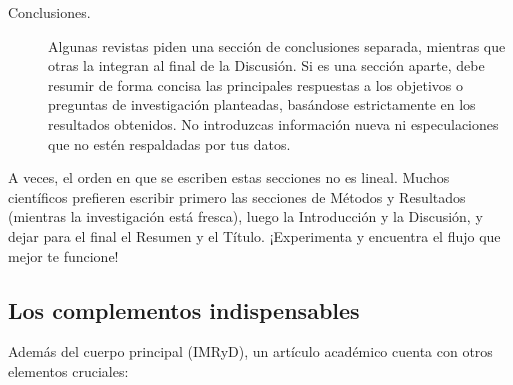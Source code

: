 \begin{description}
  \item[Conclusiones.] Algunas revistas piden una sección de conclusiones
        separada, mientras que otras la integran al final de la Discusión.
        Si es una sección aparte, debe resumir de forma concisa las principales
        respuestas a los objetivos o preguntas de investigación planteadas,
        basándose estrictamente en los resultados obtenidos.
        No introduzcas información nueva ni especulaciones que no estén
        respaldadas por tus datos.
\end{description}

A veces, el orden en que se escriben estas secciones no es lineal.
Muchos científicos prefieren escribir primero las secciones de Métodos y
Resultados (mientras la investigación está fresca), luego la Introducción y la
Discusión, y dejar para el final el Resumen y el Título.
¡Experimenta y encuentra el flujo que mejor te funcione!

\subsection*{Los complementos indispensables}
\label{sub:complementosarticulo}

Además del cuerpo principal (IMRyD), un artículo académico cuenta con otros
elementos cruciales:

